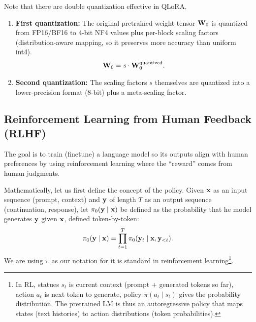 \documentclass[11pt]{article}  %
\begin{document}
Note that there are double quantization effective in QLoRA, 
\begin{enumerate}
  \item \textbf{First quantization:} The original pretrained weight tensor $\mathbf{W}_0$ is quantized from FP16/BF16 to $4$-bit NF4 values plus per-block scaling factors (distribution-aware mapping, so it preserves more accuracy than uniform int4).
  \begin{align*}
    \mathbf{W}_0 = s \cdot \mathbf{W}_0^{\text{quantized}}. 
  \end{align*}
  
  \item \textbf{Second quantization:} The scaling factors $s$ themselves are quantized into a lower-precision format (8-bit) plus a meta-scaling factor.
\end{enumerate}



\subsection{Reinforcement Learning from Human Feedback (RLHF)}
The goal is to train (finetune) a language model so its outputs align with human preferences by using reinforcement learning where the “reward” comes from human judgments.

Mathematically, let us first define the concept of the policy.
Given $\mathbf{x}$ as an input sequence (prompt, context) and $\mathbf{y}$ of length $T$ as an output sequence (continuation, response), let $\pi_0(\mathbf{y} \mid \mathbf{x})$ be defined as the probability that he model generates $\mathbf{y}$ given $\mathbf{x}$, defined token-by-token:
\begin{align*}
  \pi_0(\mathbf{y} \mid \mathbf{x}) = \prod_{t=1}^T \pi_0(\mathbf{y}_t \mid \mathbf{x}, \mathbf{y}_{<t}).
\end{align*}
We are using $\pi$ as our notation for it is standard in reinforcement learning\footnote{In RL, statues $s_t$ is current context (prompt + generated tokens so far), action $a_t$ is next token to generate, policy $\pi(a_t \mid s_t)$ gives the probability distribution. The pretrained LM is thus an autoregressive policy that maps states (text histories) to action distributions (token probabilities).}.
\end{document}
